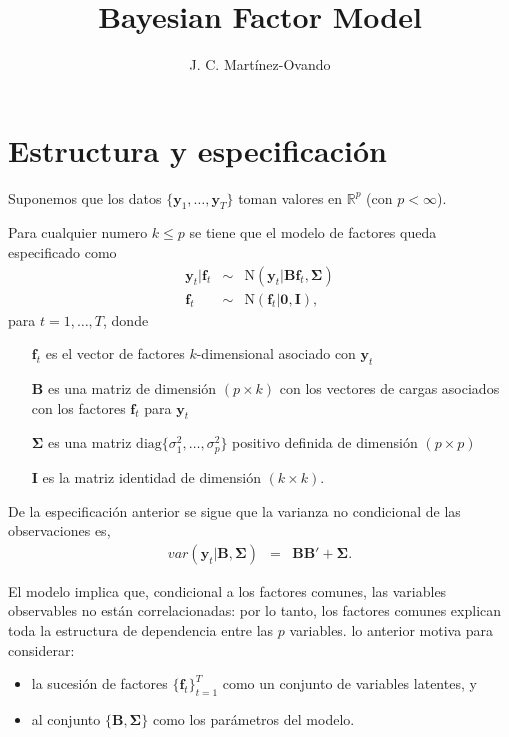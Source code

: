 \documentclass[letterpaper]{paper}
\title{Bayesian Factor Model}
\author{J. C. Mart\'inez-Ovando}
\newcommand{\boldy}{\boldsymbol{y}}
\newcommand{\boldf}{\boldsymbol{f}}
\newcommand{\boldB}{\boldsymbol{B}}
\newcommand{\boldSigma}{\boldsymbol{\Sigma}}
\newcommand{\boldzero}{\boldsymbol{0}}
\newcommand{\boldI}{\boldsymbol{I}}
\newcommand{\NormD}{\text{N}}
\newcommand{\Real}{\mathbb{R}}
\newcommand{\diag}{\text{diag}}
\begin{document}
	
\maketitle

\section{Estructura y especificaci\'on}

Suponemos que los datos $\{\boldy_1,\ldots,\boldy_T\}$ toman valores en $\Real^{p}$ (con $p<\infty$). 

Para cualquier numero $k\leq p$ se tiene que el modelo de factores queda especificado como
\begin{eqnarray}
	\boldy_t|\boldf_t 
	  & \sim &
	  \NormD\left(\boldy_t|\boldB\boldf_t,\boldSigma\right)
	  \nonumber \\
	\boldf_t
	  & \sim &
	  \NormD\left(\boldf_t|\boldzero,\boldI\right),
	  \nonumber 
\end{eqnarray}
para $t=1,\ldots,T$, donde 
\begin{itemize}
  \item[$\boldf_t$] es el vector de factores $k$-dimensional asociado con $\boldy_t$  
  \item[$\boldB$] es una matriz de dimensi\'on $(p\times k)$ con los vectores de cargas asociados con los factores $\boldf_t$ para $\boldy_t$
  \item[$\boldSigma$] es una matriz $\diag\{\sigma_1^{2},\ldots,\sigma_p^{2}\}$ positivo definida de dimensi\'on $(p\times p)$
  \item[$\boldI$] es la matriz identidad de dimensi\'on $(k\times k)$.
\end{itemize}
De la especificaci\'on anterior se sigue que la varianza no condicional de las observaciones es,
\begin{eqnarray}
 var(\boldy_t|\boldB,\boldSigma)
   & = &
   \boldB\boldB' + \boldSigma.
   \nonumber
\end{eqnarray}

El modelo implica que, condicional a los factores comunes, las variables observables no están correlacionadas: por lo tanto, los factores comunes explican toda la estructura de dependencia entre las $p$ variables. lo anterior motiva para considerar:
\begin{itemize}
	\item la sucesi\'on de factores $\{\boldf_t\}_{t=1}^{T}$ como un conjunto de variables latentes, y
	\item al conjunto $\{\boldB,\boldSigma\}$ como los par\'ametros del modelo.
\end{itemize}
\end{document}
